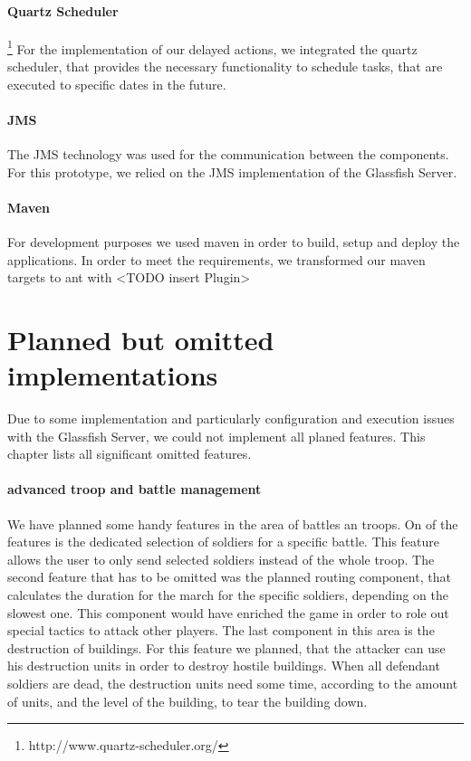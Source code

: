 \documentclass[a4paper]{article}
\begin{document}
\paragraph{Quartz Scheduler} \footnote{http://www.quartz-scheduler.org/}
For the implementation of our delayed actions, we integrated the quartz scheduler, that provides the necessary functionality to schedule tasks, that are executed to specific dates in the future.

\paragraph{JMS}
The JMS technology was used for the communication between the components. For this prototype, we relied on the JMS implementation of the Glassfish Server.

\paragraph{Maven}
For development purposes we used maven in order to build, setup and deploy the applications. In order to meet the requirements, we transformed our maven targets to ant with <TODO insert Plugin>




\section{Planned but omitted implementations}
Due to some implementation and particularly configuration and execution issues with the Glassfish Server, we could not implement all planed features. This chapter lists all significant omitted features.

\paragraph{advanced troop and battle management}
We have planned some handy features in the area of battles an troops. On of the features is the dedicated selection of soldiers for a specific battle. This feature  allows the user to only send selected soldiers instead of the whole troop. The second feature that has to be omitted was the planned routing component, that calculates the duration for the march for the specific soldiers, depending on the slowest one. This component would have enriched the game in order to role out special tactics to attack other players. The last component in this area is the destruction of buildings. For this feature we planned, that the attacker can use his destruction units in order to destroy hostile buildings. When all defendant soldiers are dead, the destruction units need some time, according to the amount of units, and the level of the building, to tear the building down.
\end{document}
